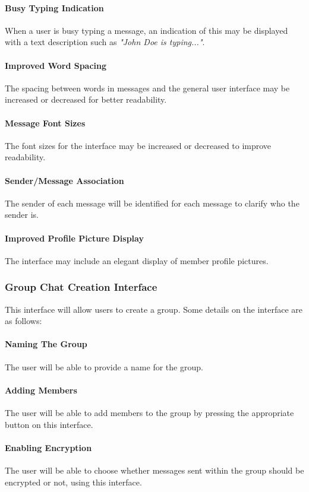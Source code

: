 \documentclass[11pt]{article}
\begin{document}
\paragraph{Busy Typing Indication} When a user is busy typing a message, an indication of this may be displayed with a text description such as \textit{"John Doe is typing..."}.
\paragraph{Improved Word Spacing} The spacing between words in messages and the general user interface may be increased or decreased for better readability.
\paragraph{Message Font Sizes} The font sizes for the interface may be increased or decreased to improve readability.
\paragraph{Sender/Message Association} The sender of each message will be identified for each message to clarify who the sender is.
\paragraph{Improved Profile Picture Display} The interface may include an elegant display of member profile pictures.
\subsubsection{Group Chat Creation Interface} This interface will allow users to create a group. Some details on the interface are as follows:
\paragraph{Naming The Group} The user will be able to provide a name for the group.
\paragraph{Adding Members} The user will be able to add members to the group by pressing the appropriate button on this interface.
\paragraph{Enabling Encryption} The user will be able to choose whether messages sent within the group should be encrypted or not, using this interface.
\end{document}
